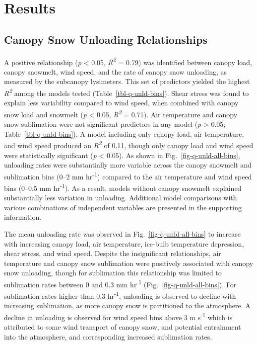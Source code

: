 \documentclass[
  letterpaper,
  DIV=11,
  numbers=noendperiod]{scrartcl}
\begin{document}
\section{Results}\label{results}

\subsection{Canopy Snow Unloading
Relationships}\label{canopy-snow-unloading-relationships}

A positive relationship (\emph{p} \textless{} 0.05,
\emph{R\textsuperscript{2}} = 0.79) was identified between canopy load,
canopy snowmelt, wind speed, and the rate of canopy snow unloading, as
measured by the subcanopy lysimeters. This set of predictors yielded the
highest \emph{R\textsuperscript{2}} among the models tested
(Table~\ref{tbl-q-unld-bins}). Shear stress was found to explain less
variability compared to wind speed, when combined with canopy snow load
and snowmelt (\emph{p} \textless{} 0.05, \emph{R\textsuperscript{2}} =
0.71). Air temperature and canopy snow sublimation were not significant
predictors in any model (\emph{p} \textgreater{} 0.05;
Table~\ref{tbl-q-unld-bins}). A model including only canopy load, air
temperature, and wind speed produced an \emph{R\textsuperscript{2}} of
0.11, though only canopy load and wind speed were statistically
significant (\emph{p} \textless{} 0.05). As shown in
Fig.~\ref{fig-q-unld-all-bins}, unloading rates were substantially more
variable across the canopy snowmelt and sublimation bins (0--2 mm
hr\textsuperscript{-1}) compared to the air temperature and wind speed
bins (0--0.5 mm hr\textsuperscript{-1}). As a result, models without
canopy snowmelt explained substantially less variation in unloading.
Additional model comparisons with various combinations of independent
variables are presented in the supporting information.

The mean unloading rate was observed in Fig.~\ref{fig-q-unld-all-bins}
to increase with increasing canopy load, air temperature, ice-bulb
temperature depression, shear stress, and wind speed. Despite the
insignificant relationships, air temperature and canopy snow sublimation
were positively associated with canopy snow unloading, though for
sublimation this relationship was limited to sublimation rates between 0
and 0.3 mm hr\textsuperscript{-1} (Fig.~\ref{fig-q-unld-all-bins}). For
sublimation rates higher than 0.3 hr\textsuperscript{-1}, unloading is
observed to decline with increasing sublimation, as more canopy snow is
partitioned to the atmosphere. A decline in unloading is observed for
wind speed bins above 3 m s\textsuperscript{-1} which is attributed to
some wind transport of canopy snow, and potential entrainment into the
atmosphere, and corresponding increased sublimation rates.
\end{document}
